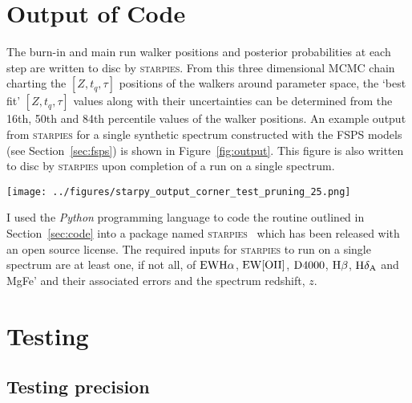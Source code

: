 \documentclass[useAMS,usenatbib]{mn2e}
\begin{document}
\section{Output of Code}\label{sec:output}

The burn-in and main run walker positions and posterior probabilities at each step are written to disc by \textsc{starpies}. From this three dimensional MCMC chain charting the $[Z, t_q, \tau]$ positions of the walkers around parameter space, the `best fit' $[Z, t_q, \tau]$ values along with their uncertainties can be determined from the 16th, 50th and 84th percentile values of the walker positions. An example output from \textsc{starpies} for a single synthetic spectrum constructed with the FSPS models (see Section~\ref{sec:fsps}) is shown in Figure~\ref{fig:output}. This figure is also written to disc by \textsc{starpies} upon completion of a run on a single spectrum.  

\begin{figure*}
\centering
\texttt{[image: ../figures/starpy\_output\_corner\_test\_pruning\_25.png]}
\caption{Example output from \textsc{starpies} showing the posterior probability function traced by the MCMC walkers across the three dimensional parameter space $[Z, t_q, \tau]$. Dashed lines show the 18th, 50th and 64th percentile of each distribution function which can be interpreted as the `best fit' with $±1\sigma$. The blue lines show the known true values which \textsc{starpies} has managed to recover.}
\label{fig:output}
\end{figure*}

I used the \emph{Python} programming language to code the routine outlined in Section~\ref{sec:code} into a package named \textsc{starpies} ~which has been released with an open source license. The required inputs for \textsc{starpies} to run on a single spectrum are at least one, if not all, of $\rm{EW}H\alpha$, $\rm{EW}[OII]$, $\rm{D}4000$, $\rm{H}\beta$, $\rm{H}\delta_A$ and MgFe' and their associated errors and the spectrum redshift, $z$. 

\section{Testing}\label{sec:test}

\subsection{Testing precision}
\end{document}
